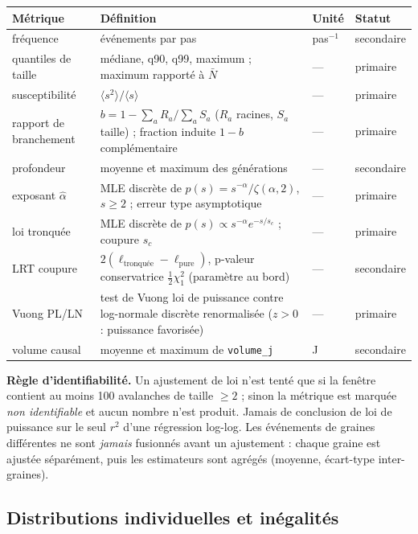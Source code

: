 \documentclass[11pt,a4paper]{article}
\newcommand{\code}[1]{\texttt{#1}}
\begin{document}
\begin{longtable}{p{}p{}p{}p{}}
\toprule
Métrique & Définition & Unité & Statut \\
\midrule
\endhead
fréquence & événements par pas & pas$^{-1}$ & secondaire \\
quantiles de taille & médiane, q90, q99, maximum ; maximum rapporté à
$\bar N$ & --- & primaire \\
susceptibilité & $\langle s^2\rangle/\langle s\rangle$ & --- & primaire \\
rapport de branchement & $b = 1 - \sum_a R_a / \sum_a S_a$ ($R_a$ racines,
$S_a$ taille) ; fraction induite $1-b$ complémentaire & --- & primaire \\
profondeur & moyenne et maximum des générations & --- & secondaire \\
exposant $\hat\alpha$ & MLE discrète de $p(s)=s^{-\alpha}/\zeta(\alpha,2)$,
$s\ge 2$ ; erreur type asymptotique & --- & primaire \\
loi tronquée & MLE discrète de $p(s)\propto s^{-\alpha}e^{-s/s_c}$ ;
coupure $s_c$ & --- & primaire \\
LRT coupure & $2(\ell_{\mathrm{tronquée}}-\ell_{\mathrm{pure}})$, p-valeur
conservatrice $\tfrac12\chi^2_1$ (paramètre au bord) & --- & secondaire \\
Vuong PL/LN & test de Vuong loi de puissance contre log-normale discrète
renormalisée ($z>0$ : puissance favorisée) & --- & primaire \\
volume causal & moyenne et maximum de \code{volume\_j} & J & secondaire \\
\bottomrule
\end{longtable}

\textbf{Règle d'identifiabilité.} Un ajustement de loi n'est tenté que si
la fenêtre contient au moins 100 avalanches de taille $\ge 2$ ; sinon la
métrique est marquée \emph{non identifiable} et aucun nombre n'est produit.
Jamais de conclusion de loi de puissance sur le seul $r^2$ d'une régression
log-log. Les événements de graines différentes ne sont \emph{jamais}
fusionnés avant un ajustement : chaque graine est ajustée séparément, puis
les estimateurs sont agrégés (moyenne, écart-type inter-graines).

\subsection{Distributions individuelles et inégalités}
\end{document}
